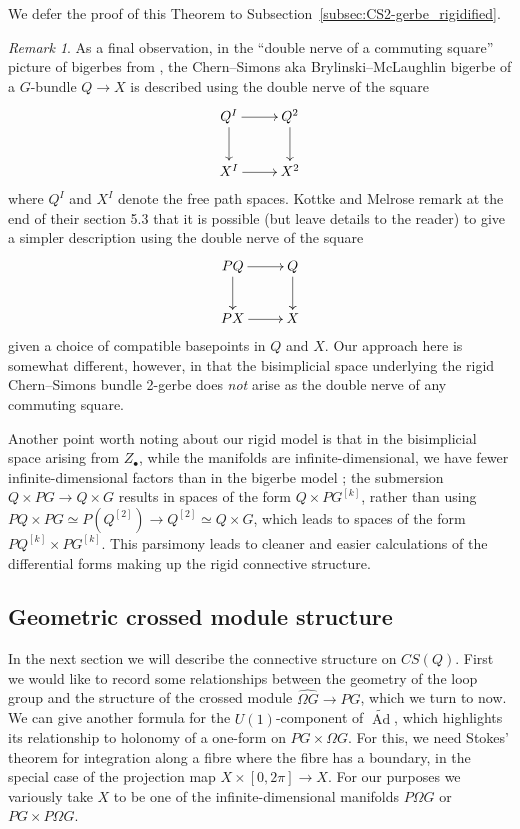 \documentclass[12pt]{amsart}
\DeclareMathOperator{\Ad}{Ad}
\theoremstyle{plain}
\theoremstyle{definition}
\theoremstyle{remark}
\newtheorem{remark}[theorem]{Remark}
\numberwithin{equation}{section}
\newcommand{\<}{\langle}
\renewcommand{\>}{\rangle}
\newcommand{\Omegahat}[1]{\widehat{\Omega #1}}
\begin{document}
We defer the proof of this Theorem to Subsection~\ref{subsec:CS2-gerbe_rigidified}.


\begin{remark}
As a final observation, in the ``double nerve of a commuting square'' picture of bigerbes from \cite{KM19}, the Chern--Simons aka Brylinski--McLaughlin bigerbe of a $G$-bundle $Q\to X$ is described using the double nerve of the square
\[
  \xymatrix{
    Q^I \ar[r] \ar[d] & Q^2 \ar[d] \\
    X^I \ar[r] & X^2
  }
\]
where $Q^I$ and $X^I$ denote the free path spaces. 
Kottke and Melrose remark at the end of their section 5.3 that it is possible (but leave details to the reader) to give a simpler description using the double nerve of the square
\[
    \xymatrix{
    PQ \ar[r] \ar[d] & Q \ar[d] \\
    PX \ar[r] & X
  }
\]
given a choice of compatible basepoints in $Q$ and $X$.
Our approach here is somewhat different, however, in that the bisimplicial space underlying the rigid Chern--Simons bundle 2-gerbe does \emph{not} arise as the double nerve of any commuting square.

Another point worth noting about our rigid model is that in the bisimplicial space arising from $Z_\bullet$, while the manifolds are infinite-dimensional, we have fewer infinite-dimensional factors than in the bigerbe model \cite{KM19}; the submersion $Q\times PG\to Q\times G$ results in spaces of the form $Q\times PG^{[k]}$, rather than using $PQ\times PG \simeq P(Q^{[2]})\to Q^{[2]} \simeq Q\times G$, which leads to spaces of the form $PQ^{[k]}\times PG^{[k]}$.
This parsimony leads to cleaner and easier calculations of the differential forms making up the rigid connective structure.

\end{remark}






\subsection{Geometric crossed module structure}

In the next section we will describe the connective structure on $CS(Q)$. 
First we would like to record some relationships between the geometry of the loop group and the structure of the crossed module $\Omegahat{G} \to PG$, which we turn to now. 
We can give another formula for the $U(1)$-component of $\widetilde{\Ad}$, which highlights its relationship to holonomy of a one-form on $PG \times \Omega G$. 
For this, we need Stokes' theorem for integration along a fibre where the fibre has a boundary, in the special case of the projection map $X \times [0,2\pi] \to X$. 
For our purposes we variously take $X$ to be one of the infinite-dimensional manifolds $P\Omega G$ or $PG\times P\Omega G$.
\end{document}
